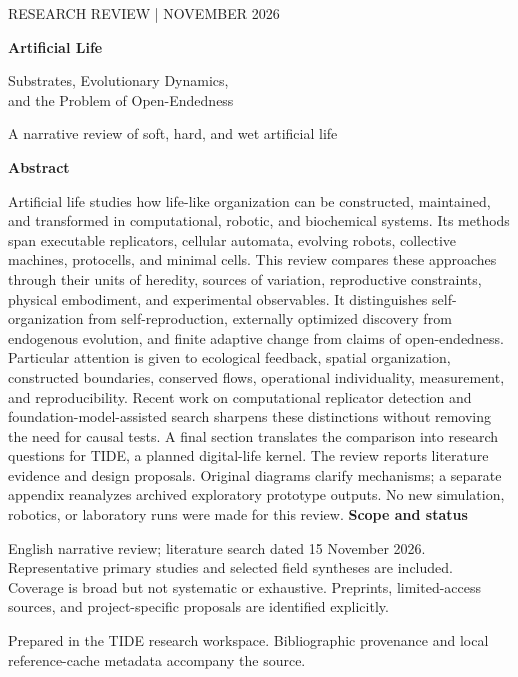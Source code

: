 \documentclass[11pt,a4paper]{article}
\begin{document}
\hypersetup{pageanchor=false}
\begin{titlepage}
\vspace*{15mm}
{\small\sffamily\textcolor{accent}{RESEARCH REVIEW \quad | \quad NOVEMBER 2026}\par}
\vspace{10mm}
{\Huge\bfseries\textcolor{ink}{Artificial Life}\par}
\vspace{4mm}
{\LARGE Substrates, Evolutionary Dynamics,\\and the Problem of Open-Endedness\par}
\vspace{10mm}
{\large A narrative review of soft, hard, and wet artificial life\par}
\vspace{12mm}
\textbf{Abstract}\par
Artificial life studies how life-like organization can be constructed, maintained,
and transformed in computational, robotic, and biochemical systems. Its methods
span executable replicators, cellular automata, evolving robots, collective
machines, protocells, and minimal cells. This review compares these approaches
through their units of heredity, sources of variation, reproductive constraints,
physical embodiment, and experimental observables. It distinguishes
self-organization from self-reproduction, externally optimized discovery from
endogenous evolution, and finite adaptive change from claims of open-endedness.
Particular attention is given to ecological feedback, spatial organization,
constructed boundaries, conserved flows, operational individuality,
measurement, and reproducibility. Recent work on computational replicator
detection and foundation-model-assisted search sharpens these distinctions
without removing the need for causal tests. A final section translates the
comparison into research questions for TIDE, a planned digital-life kernel.
The review reports literature evidence and design proposals. Original diagrams
clarify mechanisms; a separate appendix reanalyzes archived exploratory
prototype outputs. No new simulation, robotics, or laboratory runs were made
for this review.
\vfill
\textbf{Scope and status}\par
English narrative review; literature search dated 15 November 2026.
Representative primary studies and selected field syntheses are included.
Coverage is broad but not systematic or exhaustive. Preprints, limited-access
sources, and project-specific proposals are identified explicitly.\par
\vspace{6mm}
{\small Prepared in the TIDE research workspace. Bibliographic provenance and
local reference-cache metadata accompany the source.\par}
\end{titlepage}
\end{document}

